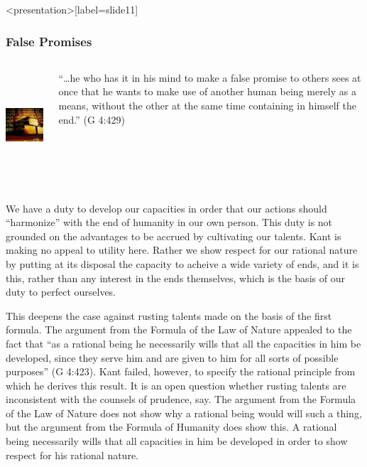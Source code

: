 \begin{frame}<presentation>[label=slide11]
    \frametitle{False Promises}
        \begin{columns}
            \begin{column}{4cm}
                \includegraphics[height=4cm]{../../../graphics/false_promises.jpg}
            \end{column}
            \begin{column}{6cm}
                ``\ldots he who has it in his mind to make a false promise to others sees at once that he wants to make use of another human being merely as a means, without the other at the same time containing in himself the end.'' (G 4:429)
            \end{column}
        \end{columns}
\end{frame}

We have a duty to develop our capacities in order that our actions should ``harmonize'' with the end of humanity in our own person. This duty is not grounded on the advantages to be accrued by cultivating our talents. Kant is making no appeal to utility here. Rather we show respect for our rational nature by putting at its disposal the capacity to acheive a wide variety of ends, and it is this, rather than any interest in the ends themselves, which is the basis of our duty to perfect ourselves.

This deepens the case against rusting talents made on the basis of the first formula. The argument from the Formula of the Law of Nature appealed to the fact that ``as a rational being he necessarily wills that all the capacities in him be developed, since they serve him and are given to him for all sorts of possible purposes'' (G 4:423). Kant failed, however, to specify the rational principle from which he derives this result. It is an open question whether rusting talents are inconsistent with the counsels of prudence, say. The argument from the Formula of the Law of Nature does not show why a rational being would will such a thing, but the argument from the Formula of Humanity does show this. A rational being necessarily wills that all capacities in him be developed in order to show respect for his rational nature. \change

